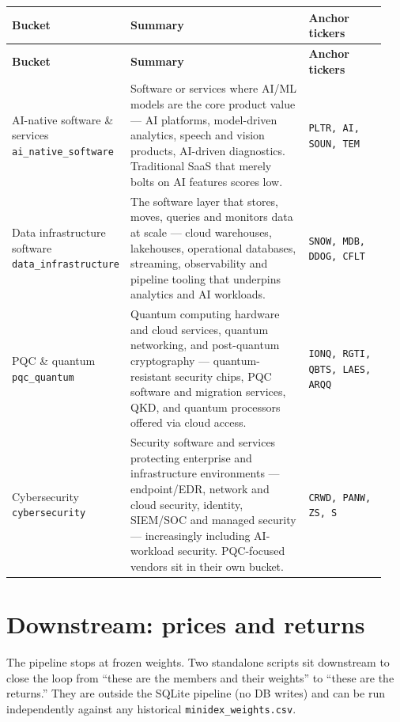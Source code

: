 \documentclass[11pt,a4paper,oneside]{article}
\begin{document}
\begin{longtable}{@{}p{0.20\linewidth} p{0.52\linewidth} p{0.22\linewidth}@{}}
\toprule
\textbf{Bucket} & \textbf{Summary} & \textbf{Anchor tickers} \\
\midrule
\endfirsthead
\toprule
\textbf{Bucket} & \textbf{Summary} & \textbf{Anchor tickers} \\
\midrule
\endhead
\bottomrule
\endfoot
AI-native software \& services \newline \texttt{ai\_native\_software} & Software or services where AI/ML models are the core product value --- AI platforms, model-driven analytics, speech and vision products, AI-driven diagnostics. Traditional SaaS that merely bolts on AI features scores low. & \texttt{PLTR, AI, SOUN, TEM} \\
\addlinespace
Data infrastructure software \newline \texttt{data\_infrastructure} & The software layer that stores, moves, queries and monitors data at scale --- cloud warehouses, lakehouses, operational databases, streaming, observability and pipeline tooling that underpins analytics and AI workloads. & \texttt{SNOW, MDB, DDOG, CFLT} \\
\addlinespace
PQC \& quantum \newline \texttt{pqc\_quantum} & Quantum computing hardware and cloud services, quantum networking, and post-quantum cryptography --- quantum-resistant security chips, PQC software and migration services, QKD, and quantum processors offered via cloud access. & \texttt{IONQ, RGTI, QBTS, LAES, ARQQ} \\
\addlinespace
Cybersecurity \newline \texttt{cybersecurity} & Security software and services protecting enterprise and infrastructure environments --- endpoint/EDR, network and cloud security, identity, SIEM/SOC and managed security --- increasingly including AI-workload security. PQC-focused vendors sit in their own bucket. & \texttt{CRWD, PANW, ZS, S} \\
\end{longtable}

\section{Downstream: prices and returns}

The pipeline stops at frozen weights. Two standalone scripts sit downstream to close the loop from ``these are the members and their weights'' to ``these are the returns.'' They are outside the SQLite pipeline (no DB writes) and can be run independently against any historical \texttt{minidex\_weights.csv}.
\end{document}
